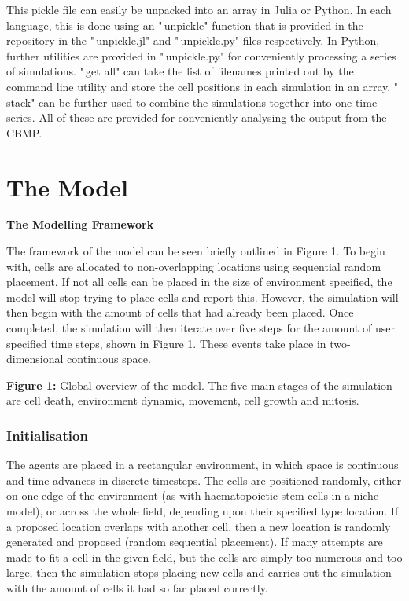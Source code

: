 \documentclass[12pt,a4paper]{report}
\begin{document}
This pickle file can easily be unpacked into an array in Julia or 
Python. In each language, this is done using an "\,unpickle" function 
that is provided in the repository in the "\,unpickle.jl" and 
"\,unpickle.py" files respectively. In Python, further utilities are 
provided in "\,unpickle.py" for conveniently processing a series of 
simulations. "\,get all" can take the list of filenames printed out by 
the command line utility and store the cell positions in each simulation 
in an array. "\,stack" can be further used to combine the simulations 
together into one time series. All of these are provided for 
conveniently analysing the output from the CBMP.



\section{The Model}
{\bfseries The Modelling Framework}

The framework of the model can be seen briefly outlined in Figure 1. To 
begin with, cells are allocated to non-overlapping locations using 
sequential random placement. If not all cells can be placed in the size 
of environment specified, the model will stop trying to place cells and 
report this. However, the simulation will then begin with the amount of 
cells that had already been placed. Once completed, the simulation will 
then iterate over five steps for the amount of user specified time 
steps, shown in Figure 1. These events take place in two-dimensional 
continuous space. 





\begin{figure}[H]
\centering
\end{figure}


{\bfseries Figure 1:} Global overview of the model. The five main stages 
of the simulation are cell death, environment dynamic, movement, cell 
growth and mitosis.



\subsubsection{Initialisation}
The agents are placed in a rectangular environment, in which space is 
continuous and time advances in discrete timesteps. The cells are 
positioned randomly, either on one edge of the environment (as with 
haematopoietic stem cells in a niche model), or across the whole field, 
depending upon their specified type location. If a proposed location 
overlaps with another cell, then a new location is randomly generated 
and proposed (random sequential placement). If many attempts are made to 
fit a cell in the given field, but the cells are simply too numerous and 
too large, then the simulation stops placing new cells and carries out 
the simulation with the amount of cells it had so far placed correctly.
\end{document}
